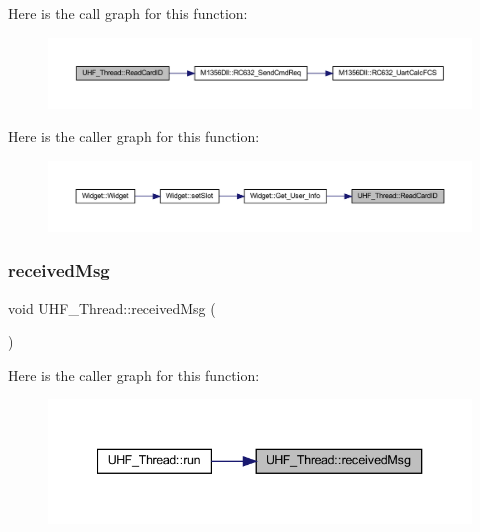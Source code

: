 Here is the call graph for this function\+:
\nopagebreak
\begin{figure}[H]
\begin{center}
\leavevmode
\includegraphics[width=350pt]{class_u_h_f___thread_a6dcb8fe026e47d35c7d992b860c86492_cgraph}
\end{center}
\end{figure}
Here is the caller graph for this function\+:
\nopagebreak
\begin{figure}[H]
\begin{center}
\leavevmode
\includegraphics[width=350pt]{class_u_h_f___thread_a6dcb8fe026e47d35c7d992b860c86492_icgraph}
\end{center}
\end{figure}
\mbox{\label{class_u_h_f___thread_aa3b7dd0bbada4349d59821aab8a17927}} 
\subsubsection{\texorpdfstring{receivedMsg}{receivedMsg}}
{\footnotesize\ttfamily void U\+H\+F\+\_\+\+Thread\+::received\+Msg (\begin{DoxyParamCaption}\item[{Q\+Byte\+Array}]{ }\end{DoxyParamCaption})\hspace{0.3cm}{\ttfamily [signal]}}

Here is the caller graph for this function\+:
\nopagebreak
\begin{figure}[H]
\begin{center}
\leavevmode
\includegraphics[width=340pt]{class_u_h_f___thread_aa3b7dd0bbada4349d59821aab8a17927_icgraph}
\end{center}
\end{figure}
\mbox{\label{class_u_h_f___thread_a7ae2a5c0bae9b20e0fbc315febefb818}} 

